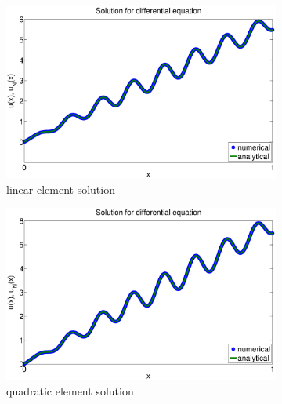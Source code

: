 \documentclass[paper=a4, fontsize=11pt]{article} %
\begin{document}
\begin{figure}
        \centering
        \begin{subfigure}[b]{0.6\textwidth}
                \includegraphics[width=\textwidth]{solution_P1.eps}
                \caption{linear element solution}
                \label{fig:k2}
        \end{subfigure}%
        \begin{subfigure}[b]{0.6\textwidth}
                \includegraphics[width=\textwidth]{solution_P2.eps}
                \caption{quadratic element solution}
                \label{fig:k4}
        \end{subfigure}
        \begin{subfigure}[b]{0.6\textwidth}

\end{subfigure}
\end{figure}
\end{document}

